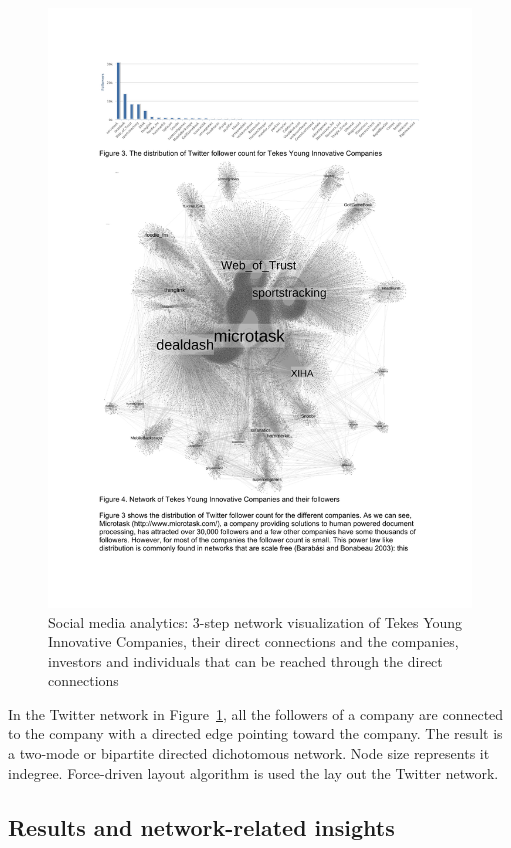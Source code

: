 \begin{figure}[htb]
\centering
\includegraphics[width=12cm]{figure/Tekes-YIC-Twitter.pdf}
\caption{Social media analytics: 3-step network visualization of Tekes Young Innovative Companies, their direct connections and the companies, investors and individuals that can be reached through the direct connections
 \citep{Huhtamaki2012NetworksFinland}}
\label{fig:tekes-yic-twitter}
\end{figure}

In the Twitter network in Figure~\ref{fig:tekes-yic-twitter}, all the followers of a company are connected to the company with a directed edge pointing toward the company. The result is a two-mode or bipartite directed dichotomous network. Node size represents it indegree. Force-driven layout algorithm is used the lay out the Twitter network.

\subsection{Results and network-related insights}

